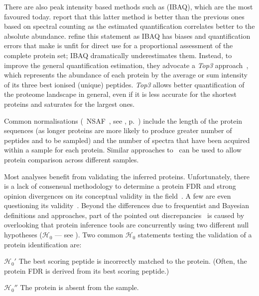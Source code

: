 There are also peak intensity based methods such as  (\gls{IBAQ}),
which are the most favoured today.
\citet{Arike2012} report that this latter method is better than the previous ones
based on spectral counting as the estimated quantification correlates better to
the absolute abundance.
\citet{TOP3isbetter} refine this statement
as \gls{IBAQ} has biases and quantification errors
that make is unfit for direct
use for a proportional assessment of the complete protein set;
\gls{IBAQ} dramatically underestimates them.
Instead, to improve the general quantification estimation,
they advocate a \emph{Top3} approach~,
which represents the abundance of each protein by the average or sum intensity of
its three best ionised (unique) peptides.
\emph{Top3} allows better quantification of the proteome landscape in general,
even if it is less accurate for the shortest proteins and
saturates for the largest ones.\mybr\

Common normalisations
(\eg\ \gls{NSAF}~, see , p.~\pageref{eq:NSAF})
include the length of the protein sequences
(as longer proteins are more likely to produce greater number of peptides and
to be sampled) and the number of spectra that have been acquired within a sample
for each protein.
Similar approaches to \Rnaseq\ can be used to allow protein comparison
across different samples.\mybr\

Most analyses benefit from validating the inferred proteins.
Unfortunately,
there is a lack of consensual methodology
to determine a protein \gls{FDR}
and strong opinion divergences on its conceptual validity
in the field~.
A few are even questioning its validity~.
Beyond the differences due to frequentist and Bayesian definitions and approaches,
part of the pointed out discrepancies~ is caused by
overlooking that protein inference tools are concurrently using
two different null hypotheses ($\mathcal{H}_0$ --- see ).
Two common $\mathcal{H}_0$ statements testing
the validation of a protein identification are:\mybr\
\begin{eqlist}
    \item[$\mathcal{H}_0'$] The best scoring peptide is incorrectly matched
        to the protein.
        (Often, the protein \gls{FDR} is derived from its best scoring peptide.)
    \item[$\mathcal{H}_0''$] The protein is absent from the sample.
\end{eqlist}

